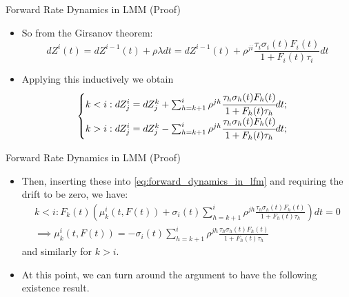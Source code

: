 \documentclass{beamer}
\begin{document}
\begin{frame}{Forward Rate Dynamics in LMM (Proof)}
  \begin{itemize}
  \item<1-> So from the Girsanov theorem:
    \begin{equation*}
      dZ^i(t) = dZ^{i-1}(t)+\rho\lambda dt = dZ^{i-1}(t)+\rho^{ji}\frac{\tau_i\sigma_i(t)F_i(t)}{1+F_i(t)\tau_i} dt
    \end{equation*}
  \item<2-> Applying this inductively we obtain
    \begin{equation*}
  	\begin{cases}
	k < i : dZ^i_j = dZ^k_j + \sum_{h=k+1}^i \rho^{jh}\cfrac{\tau_h\sigma_h(t)F_h(t)}{1+F_h(t)\tau_h} dt;\\
	k > i : dZ^i_j = dZ^k_j - \sum_{h=k+1}^i \rho^{jh}\cfrac{\tau_h\sigma_h(t)F_h(t)}{1+F_h(t)\tau_h} dt;\\
  	\end{cases}
    \end{equation*}
  \end{itemize}
\end{frame}

\begin{frame}{Forward Rate Dynamics in LMM (Proof)}
	\begin{itemize}
	\item<1-> Then, inserting these into \cref{eq:forward_dynamics_in_lfm} and requiring the drift to be zero, we have:
		\begin{equation*}
			\begin{gathered}
				k < i : F_k(t)\left( \mu_k^i(t, F(t)) + \sigma_i(t)\sum_{h=k+1}^i \rho^{jh} \frac{\tau_h\sigma_h(t)F_h(t)}{1+F_h(t)\tau_h}\right) dt = 0 \\
				\implies \mu_k^i(t, F(t)) = - \sigma_i(t)\sum_{h=k+1}^i \rho^{jh} \frac{\tau_h\sigma_h(t)F_h(t)}{1+F_h(t)\tau_h}
			\end{gathered}
		\end{equation*}
		and similarly for $k > i$.
\myendproof
	\item<2-> At this point, we can turn around the argument to have the following existence result.
	\end{itemize}
\end{frame}
\end{document}
